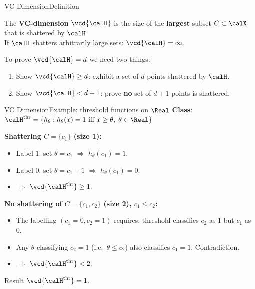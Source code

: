 \begin{frame}{VC Dimension}{Definition}
  \begin{mydefinition}[VC Dimension]
    The \textcolor{AccentBlue}{\textbf{VC-dimension}} $\vcd{\calH}$ is the size of the
    \textbf{largest} subset $C\subset\calX$ that is shattered by $\calH$.\\[4pt]
    If $\calH$ shatters arbitrarily large sets: $\vcd{\calH} = \infty$.
  \end{mydefinition}
  \bigskip
  \begin{block}{To prove $\vcd{\calH} = d$ we need two things:}
    \begin{enumerate}
      \item Show $\vcd{\calH} \geq d$: exhibit a set of $d$ points shattered by $\calH$.
      \item Show $\vcd{\calH} < d+1$: prove \textbf{no} set of $d+1$ points is shattered.
    \end{enumerate}
  \end{block}
\end{frame}

\begin{frame}{VC Dimension}{Example: threshold functions on $\Real$}
  \textbf{Class}: $\calH^{\text{thr}} = \{h_\theta : h_\theta(x)=1 \text{ iff } x\geq\theta,\;
  \theta\in\Real\}$

  \medskip
  \textbf{Shattering $C=\{c_1\}$ (size 1):}
  \begin{itemize}
    \item Label $1$: set $\theta=c_1$ $\Rightarrow$ $h_\theta(c_1)=1$. \checkmark
    \item Label $0$: set $\theta=c_1+1$ $\Rightarrow$ $h_\theta(c_1)=0$. \checkmark
    \item $\Rightarrow$ $\vcd{\calH^{\text{thr}}} \geq 1$.
  \end{itemize}

  \medskip
  \textbf{No shattering of $C=\{c_1,c_2\}$ (size 2), $c_1 \leq c_2$:}
  \begin{itemize}
    \item The labelling $(c_1=0, c_2=1)$ requires: threshold classifies $c_2$ as $1$ but
          $c_1$ as $0$.
    \item Any $\theta$ classifying $c_2=1$ (i.e.\ $\theta\leq c_2$) also classifies
          $c_1=1$. Contradiction.
    \item $\Rightarrow$ $\vcd{\calH^{\text{thr}}} < 2$.
  \end{itemize}

  \bigskip
  \begin{block}{Result}
    $\vcd{\calH^{\text{thr}}} = 1$.
  \end{block}
\end{frame}

